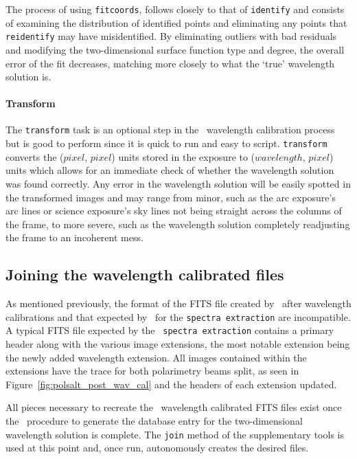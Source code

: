 The process of using \texttt{fitcoords}, follows closely to that of \texttt{identify} and consists of examining the distribution of identified points and eliminating any points that \texttt{reidentify} may have misidentified. By eliminating outliers with bad residuals and modifying the two-dimensional surface function type and degree, the overall error of the fit decreases, matching more closely to what the `true' wavelength solution is.

\paragraph{Transform}
The \texttt{transform} task is an optional step in the \iraf\ wavelength calibration process but is good to perform since it is quick to run and easy to script. \texttt{transform} converts the ($pixel$, $pixel$) units stored in the exposure to ($wavelength$, $pixel$) units which allows for an immediate check of whether the wavelength solution was found correctly. Any error in the wavelength solution will be easily spotted in the transformed images and may range from minor, such as the arc exposure's arc lines or science exposure's sky lines not being straight across the columns of the frame, to more severe, such as the wavelength solution completely readjusting the frame to an incoherent mess.



\subsection{Joining the wavelength calibrated files}

As mentioned previously, the format of the \gls{FITS} file created by \iraf\ after wavelength calibrations and that expected by \polsalt\ for the \texttt{spectra extraction} are incompatible. A typical \gls{FITS} file expected by the \polsalt\ \texttt{spectra extraction} contains a primary header along with the various image extensions, the most notable extension being the newly added wavelength extension. All images contained within the extensions have the trace for both polarimetry beams split, as seen in Figure~\ref{fig:polsalt_post_wav_cal} and the headers of each extension updated.
\prgph

All pieces necessary to recreate the \polsalt\ wavelength calibrated \gls{FITS} files exist once the \iraf\ procedure to generate the database entry for the two-dimensional wavelength solution is complete. The \texttt{join} method of the supplementary tools is used at this point and, once run, autonomously creates the desired files.
\prgph

